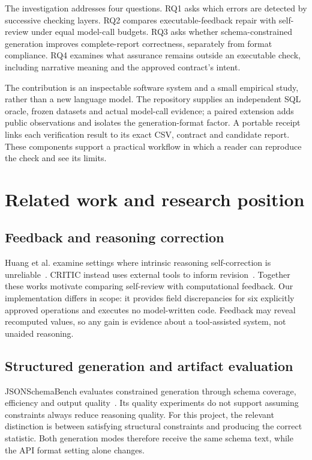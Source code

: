 The investigation addresses four questions. RQ1 asks which errors are detected by successive checking layers. RQ2 compares executable-feedback repair with self-review under equal model-call budgets. RQ3 asks whether schema-constrained generation improves complete-report correctness, separately from format compliance. RQ4 examines what assurance remains outside an executable check, including narrative meaning and the approved contract's intent.

The contribution is an inspectable software system and a small empirical study, rather than a new language model. The repository supplies an independent SQL oracle, frozen datasets and actual model-call evidence; a paired extension adds public observations and isolates the generation-format factor. A portable receipt links each verification result to its exact CSV, contract and candidate report. These components support a practical workflow in which a reader can reproduce the check and see its limits.

\section{Related work and research position}
\subsection{Feedback and reasoning correction}
Huang et al. examine settings where intrinsic reasoning self-correction is unreliable~\cite{huang2024selfcorrect}. CRITIC instead uses external tools to inform revision~\cite{gou2024critic}. Together these works motivate comparing self-review with computational feedback. Our implementation differs in scope: it provides field discrepancies for six explicitly approved operations and executes no model-written code. Feedback may reveal recomputed values, so any gain is evidence about a tool-assisted system, not unaided reasoning.

\subsection{Structured generation and artifact evaluation}
JSONSchemaBench evaluates constrained generation through schema coverage, efficiency and output quality~\cite{geng2025jsonschema}. Its quality experiments do not support assuming constraints always reduce reasoning quality. For this project, the relevant distinction is between satisfying structural constraints and producing the correct statistic. Both generation modes therefore receive the same schema text, while the API format setting alone changes.

